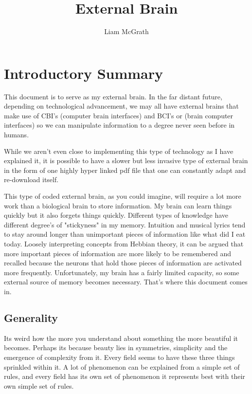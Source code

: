 \documentclass{article}
\title{External Brain}
\author{Liam McGrath}
\begin{document}
\maketitle

\tableofcontents

\section{Introductory Summary}

  This document is to serve as my external brain. In the far distant future, depending on technological advancement, we may all have external brains that make use of CBI's (computer brain interfaces) and BCI's or (brain computer interfaces) so we can manipulate information to a degree never seen before in humans. 
  
  While we aren't even close to implementing this type of technology as I have explained it, it is possible to have a slower but less invasive type of external brain in the form of one highly hyper linked pdf file that one can constantly adapt and re-download itself. 
  
  This type of coded external brain, as you could imagine, will require a lot more work than a biological brain to store information. My brain can learn things quickly but it also forgets things quickly. Different types of knowledge have different degree's of "stickyness" in my memory. Intuition and musical lyrics tend to stay around longer than unimportant pieces of information like what did I eat today. Loosely interpreting concepts from Hebbian theory, it can be argued that more important pieces of information are more likely to be remembered and recalled because the neurons that hold those pieces of information are activated more frequently. Unfortunately, my brain has a fairly limited capacity, so some external source of memory becomes necessary. That's where this document comes in. 
  
\subsection{Generality}

Its weird how the more you understand about something the more beautiful it becomes. Perhaps its because beauty lies in symmetries, simplicity and the emergence of complexity from it. Every field seems to have these three things sprinkled within it. A lot of phenomenon can be explained from a simple set of rules, and every field has its own set of phenomenon it represents best with their own simple set of rules. 
\end{document}
